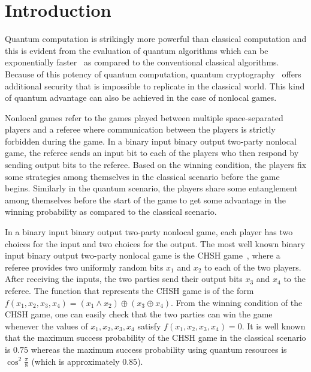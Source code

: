 \documentclass[]{svjour3}
\begin{document}


\section{Introduction}\label{sec1}

Quantum computation is strikingly more powerful than classical computation and this is evident from the evaluation of quantum algorithms which can be exponentially faster~\cite{SH94,SM94} as compared to the conventional classical algorithms. Because of this potency of quantum computation, quantum cryptography~\cite{BB84} offers additional security that is impossible to replicate in the classical world. This kind of quantum advantage can also be achieved in the case of nonlocal games.

Nonlocal games refer to the games played between multiple space-separated players and a referee where communication between the players is strictly forbidden during the game. In a binary input binary output two-party nonlocal game, the referee sends an input bit to each of the players who then respond by sending output bits to the referee. Based on the winning condition, the players fix some strategies among themselves in the classical scenario before the game begins. Similarly in the quantum scenario, the players share some entanglement among themselves before the start of the game to get some advantage in the winning probability as compared to the classical scenario.

In a binary input binary output two-party nonlocal game, each player has two choices for the input and two choices for the output. The most well known binary input binary output two-party nonlocal game is the CHSH game~\cite{CHSH69}, where a referee provides two uniformly random bits $x_1$ and $x_2$ to each of the two players. After receiving the inputs, the two parties send their output bits $x_3$ and $x_4$ to the referee. The function that represents the CHSH game is of the form $f(x_1, x_2, x_3, x_4) = (x_1 \wedge x_2) \oplus (x_3 \oplus x_4)$. From the winning condition of the CHSH game, one can easily check that the two parties can win the game whenever the values of $x_1, x_2, x_3, x_4$ satisfy $f(x_1, x_2, x_3, x_4) = 0$. It is well known that the maximum success probability of the CHSH game in the classical scenario is $0.75$ whereas the maximum success probability using quantum resources is $\cos^2\frac{\pi}{8}$ (which is approximately $0.85$).
\end{document}
